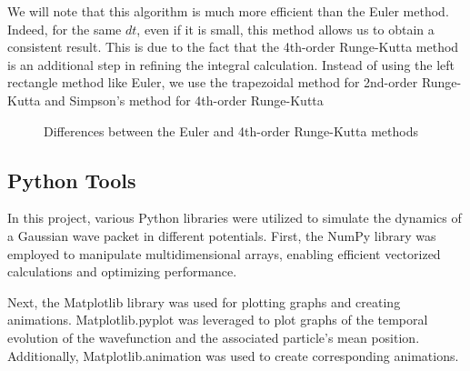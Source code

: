 \documentclass[12pt,french]{article}
\begin{document}
We will note that this algorithm is much more efficient than the Euler method. Indeed, for the same $dt$, even if it is small, this method allows us to obtain a consistent result. This is due to the fact that the 4th-order Runge-Kutta method is an additional step in refining the integral calculation. Instead of using the left rectangle method like Euler, we use the trapezoidal method for 2nd-order Runge-Kutta and Simpson's method for 4th-order Runge-Kutta

\clearpage
\begin{figure}[h!]%
    \centering
    \qquad
    \caption{Differences between the Euler and 4th-order Runge-Kutta methods}%
    \label{fig:eulerrk4}%
\end{figure}


\subsection{Python Tools}

In this project, various Python libraries were utilized to simulate the dynamics of a Gaussian wave packet in different potentials. First, the NumPy library was employed to manipulate multidimensional arrays, enabling efficient vectorized calculations and optimizing performance.

Next, the Matplotlib library was used for plotting graphs and creating animations. Matplotlib.pyplot was leveraged to plot graphs of the temporal evolution of the wavefunction and the associated particle's mean position. Additionally, Matplotlib.animation was used to create corresponding animations.
\end{document}
